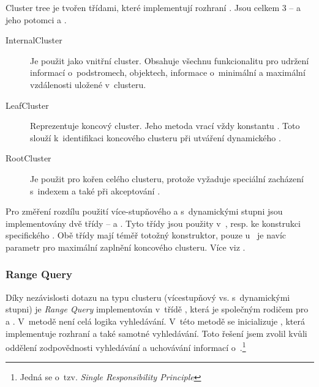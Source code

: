 Cluster tree je tvořen třídami, které implementují rozhraní \linebreak {}. Jsou celkem 3 -- 
 a jeho potomci   a .

\begin{description}
\item[InternalCluster] Je použit jako vnitřní cluster. Obsahuje všechnu funkcionalitu pro udržení informací o~podstromech, objektech, informace o~minimální a maximální vzdálenosti uložené v~clusteru.
\item[LeafCluster] Reprezentuje koncový cluster. Jeho metoda \linebreak {} vrací vždy konstantu . Toto slouží k~identifikaci koncového clusteru při utváření dynamického .
\item[RootCluster] Je použit pro kořen celého clusteru, protože vyžaduje speciální zacházení s~indexem a také při akceptování .
\end{description}

Pro změření rozdílu použití více-stupňového  a  s~dynamickými stupni jsou implementovány dvě třídy -- \linebreak {} a \linebreak {}. Tyto třídy jsou použity v~, \linebreak resp.  ke konstrukci specifického .
Obě třídy mají téměř totožný konstruktor, pouze \linebreak u~ je navíc parametr pro maximální zaplnění koncového clusteru. Více viz .

\subsubsection{Range Query}
Díky nezávislosti dotazu na typu clusteru (vícestupňový vs. s~dynamickými stupni) je \emph{Range Query} implementován v~třídě , která je společným rodičem pro  a .
V~metodě  není celá logika vyhledávání.
 V~této metodě se inicializuje , která implementuje rozhraní  a také samotné vyhledávání.
Toto řešení jsem zvolil kvůli oddělení zodpovědnosti vyhledávání a uchovávání informací o~.\footnote{Jedná se o~tzv. \emph{Single Responsibility Principle}\cite{martin2003agile}}

